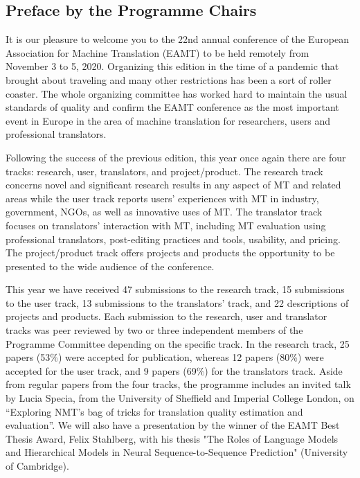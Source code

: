 \documentclass[a4paper,11pt,twoside]{book}
\begin{document}
\begin{onehalfspacing}
\chapter*{Preface by the Programme Chairs}

It is our pleasure to welcome you to the 22nd annual conference of the European Association for Machine Translation (EAMT) to be held remotely from November 3 to 5, 2020. Organizing this edition in the time of a pandemic that brought about traveling and many other restrictions has been a sort of roller coaster. The whole organizing committee has worked hard to maintain the usual standards of quality and confirm the EAMT conference as the most important event in Europe in the area of machine translation for researchers, users and professional translators.

Following the success of the previous edition, this year once again there are four tracks: research, user, translators, and project/product. The research track concerns novel and significant research results in any aspect of MT and related areas while the user track reports users’ experiences with MT in industry, government, NGOs, as well as innovative uses of MT. The translator track focuses on translators’ interaction with MT, including MT evaluation using professional translators, post-editing practices and tools, usability, and pricing. The project/product track offers projects and products the opportunity to be presented to the wide audience of the conference.

This year we have received 47 submissions to the research track, 15 submissions to the user track, 13 submissions to the translators’ track, and 22 descriptions of projects and products. Each submission to the research, user and translator tracks was peer reviewed by two or three independent members of the Programme Committee depending on the specific track. In the research track, 25 papers (53\%) were accepted for publication, whereas 12 papers (80\%) were accepted for the user track, and 9 papers (69\%) for the translators track. 
Aside from regular papers from the four tracks, the programme includes an invited talk by Lucia Specia, from the University of Sheffield and Imperial College London, on “Exploring NMT’s bag of tricks for translation quality estimation and evaluation”. We will also have a presentation by the winner of the EAMT Best Thesis Award, Felix Stahlberg, with his thesis "The Roles of Language Models and Hierarchical Models in Neural Sequence-to-Sequence Prediction" (University of Cambridge).


\end{onehalfspacing}
\end{document}
